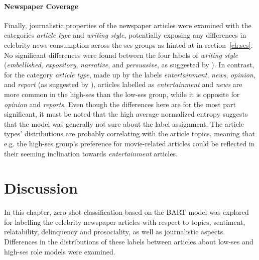 \paragraph{Newspaper Coverage}
Finally, journalistic properties of the newspaper articles were examined with the categories \textit{article type} and \textit{writing style}, potentially exposing any differences in celebrity news consumption across the \gls{ses} groups as hinted at in section~\ref{ch:ses}. No significant differences were found between the four labels of \textit{writing style} (\textit{embellished}, \textit{expository}, \textit{narrative}, and \textit{persuasive}, as suggested by \cite{traffis_learn_2017}). In contrast, for the category \textit{article type}, made up by the labels \textit{entertainment}, \textit{news}, \textit{opinion}, and \textit{report} (as suggested by \cite{davis_4_2022}), articles labelled as \textit{entertainment} and \textit{news} are more common in the high-\gls{ses} than the low-\gls{ses} group, while it is opposite for \textit{opinion} and \textit{reports}. Even though the differences here are for the most part significant, it must be noted that the high average normalized entropy suggests that the model was generally not sure about the label assignment. The article types' distributions are probably correlating with the article topics, meaning that e.g. the high-\gls{ses} group's preference for movie-related articles could be reflected in their seeming inclination towards \textit{entertainment} articles.

\section{Discussion}
In this chapter, zero-shot classification based on the BART model was explored for labelling the celebrity newspaper articles with respect to topics, sentiment, relatability, delinquency and prosociality, as well as journalistic aspects. Differences in the distributions of these labels between articles about low-\gls{ses} and high-\gls{ses} role models were examined.

